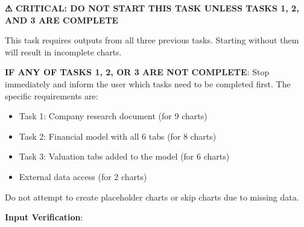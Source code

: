 \documentclass[11pt]{article}
\begin{document}
\textbf{⚠ CRITICAL: DO NOT START THIS TASK UNLESS TASKS 1, 2, AND 3 ARE COMPLETE}


This task requires outputs from all three previous tasks. Starting without them will result in incomplete charts.


\textbf{IF ANY OF TASKS 1, 2, OR 3 ARE NOT COMPLETE}: Stop immediately and inform the user which tasks need to be completed first. The specific requirements are:

\begin{itemize}[leftmargin=*,itemsep=2pt,topsep=2pt]
\item {} Task 1: Company research document (for 9 charts)
\item {} Task 2: Financial model with all 6 tabs (for 8 charts)
\item {} Task 3: Valuation tabs added to the model (for 6 charts)
\item {} External data access (for 2 charts)
\end{itemize}

Do not attempt to create placeholder charts or skip charts due to missing data.


\textbf{Input Verification}:
\end{document}

